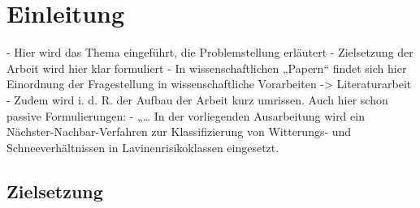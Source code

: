 
\section{Einleitung}

- Hier wird das Thema eingeführt, die Problemstellung erläutert 
- Zielsetzung der Arbeit wird hier klar formuliert
- In wissenschaftlichen „Papern“  findet sich hier Einordnung der 
Fragestellung in wissenschaftliche Vorarbeiten -> Literaturarbeit 
- Zudem wird i. d. R. der Aufbau der Arbeit kurz umrissen.
Auch hier schon passive Formulierungen:
- „…
In der vorliegenden Ausarbeitung wird ein Nächster-Nachbar-Verfahren 
zur Klassifizierung von Witterungs- und Schneeverhältnissen in 
Lavinenrisikoklassen eingesetzt.

\subsection{Zielsetzung}

